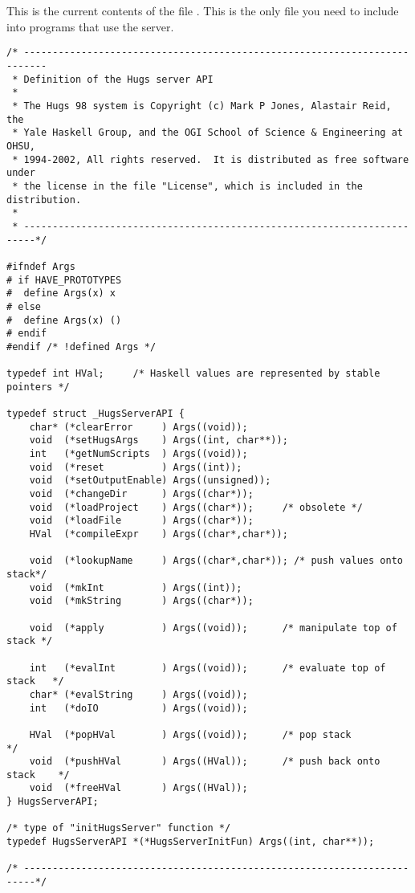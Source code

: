 \appendix

\section{}\label{server.c}

This is the current contents of the file .  This is
the only file you need to include into programs that use the server.

\begin{verbatim}
/* --------------------------------------------------------------------------
 * Definition of the Hugs server API
 *
 * The Hugs 98 system is Copyright (c) Mark P Jones, Alastair Reid, the
 * Yale Haskell Group, and the OGI School of Science & Engineering at OHSU,
 * 1994-2002, All rights reserved.  It is distributed as free software under
 * the license in the file "License", which is included in the distribution.
 *
 * ------------------------------------------------------------------------*/

#ifndef Args
# if HAVE_PROTOTYPES
#  define Args(x) x
# else
#  define Args(x) ()
# endif
#endif /* !defined Args */

typedef int HVal;     /* Haskell values are represented by stable pointers */

typedef struct _HugsServerAPI {
    char* (*clearError     ) Args((void));
    void  (*setHugsArgs    ) Args((int, char**));
    int   (*getNumScripts  ) Args((void));
    void  (*reset          ) Args((int));
    void  (*setOutputEnable) Args((unsigned));
    void  (*changeDir      ) Args((char*));
    void  (*loadProject    ) Args((char*));     /* obsolete */
    void  (*loadFile       ) Args((char*));
    HVal  (*compileExpr    ) Args((char*,char*));

    void  (*lookupName     ) Args((char*,char*)); /* push values onto stack*/
    void  (*mkInt          ) Args((int));
    void  (*mkString       ) Args((char*));

    void  (*apply          ) Args((void));      /* manipulate top of stack */

    int   (*evalInt        ) Args((void));      /* evaluate top of stack   */
    char* (*evalString     ) Args((void));
    int   (*doIO           ) Args((void));

    HVal  (*popHVal        ) Args((void));      /* pop stack               */
    void  (*pushHVal       ) Args((HVal));      /* push back onto stack    */
    void  (*freeHVal       ) Args((HVal)); 
} HugsServerAPI;

/* type of "initHugsServer" function */
typedef HugsServerAPI *(*HugsServerInitFun) Args((int, char**));

/* ------------------------------------------------------------------------*/

\end{verbatim}


